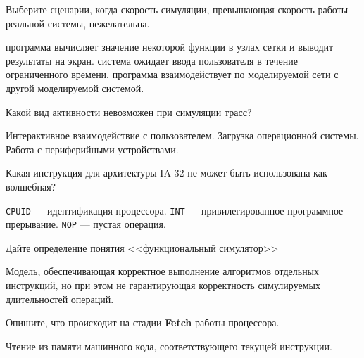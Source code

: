 \documentclass[a4paper, addpoints]{exam}
\begin{document}
\begin{questions}
\question[1] Выберите сценарии, когда скорость симуляции, превышающая скорость работы реальной системы, нежелательна.
\begin{choices}
    \choice программа вычисляет значение некоторой функции в узлах сетки и выводит результаты на экран.
    \correctchoice система ожидает ввода пользователя в течение ограниченного времени.
    \choice программа взаимодействует по моделируемой сети с другой моделируемой системой.
\end{choices}

\question[1] Какой вид активности невозможен при симуляции трасс?
\begin{choices}
\correctchoice Интерактивное взаимодействие с пользователем.
\choice Загрузка операционной системы.
\choice Работа с периферийными устройствами.
\end{choices}

\question[1] Какая инструкция для архитектуры IA-32 не может быть использована как волшебная?
\begin{choices}
\choice \texttt{CPUID} --- идентификация процессора.
\correctchoice \texttt{INT} --- привилегированное программное прерывание.
\choice \texttt{NOP} --- пустая операция.
\end{choices}



\question[3] Дайте определение понятия <<функциональный симулятор>>
\begin{solution}[2cm]
Модель, обеспечивающая корректное выполнение алгоритмов отдельных инструкций, но при этом не гарантирующая корректность симулируемых длительностей операций.
\end{solution}
    

\question[3] Опишите, что происходит на стадии \textbf{Fetch} работы процессора.
\begin{solution}[1cm]
Чтение из памяти машинного кода, соответствующего текущей инструкции.
\end{solution}




\end{questions}
\end{document}
